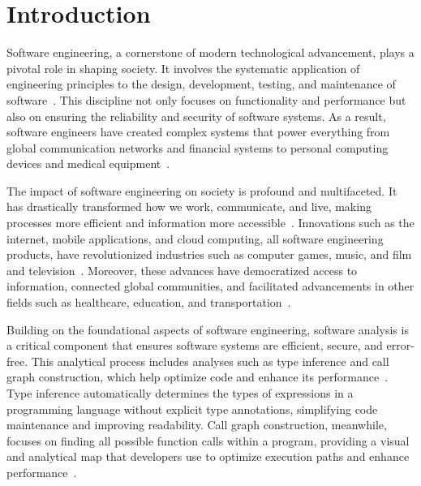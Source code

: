 \NewDocumentCommand{}

\chapter{Introduction}
\label{ch:intro}


Software engineering, a cornerstone of modern technological advancement, plays a pivotal role in shaping society. It involves the systematic application of engineering principles to the design, development, testing, and maintenance of software~\cite{ianbook}. This discipline not only focuses on functionality and performance but also on ensuring the reliability and security of software systems. As a result, software engineers have created complex systems that power everything from global communication networks and financial systems to personal computing devices and medical equipment~\cite{ke2012software, rausch2013software}.

The impact of software engineering on society is profound and multifaceted. It has drastically transformed how we work, communicate, and live, making processes more efficient and information more accessible~\cite{ianbook}. Innovations such as the internet, mobile applications, and cloud computing, all software engineering products, have revolutionized industries such as
computer games, music, and film and television~\cite{vaudour2020software}. Moreover, these advances have democratized access to information, connected global communities, and facilitated advancements in other fields such as healthcare, education, and transportation~\cite{xu2018industry}.

Building on the foundational aspects of software engineering, software analysis is a critical component that ensures software systems are efficient, secure, and error-free. This analytical process includes analyses such as type inference and call graph construction, which help optimize code and enhance its performance~\cite{nielson2015principles}. Type inference automatically determines the types of expressions in a programming language without explicit type annotations, simplifying code maintenance and improving readability. Call graph construction, meanwhile, focuses on finding all possible function calls within a program, providing a visual and analytical map that developers use to optimize execution paths and enhance performance~\cite{ryder1979constructing}.

